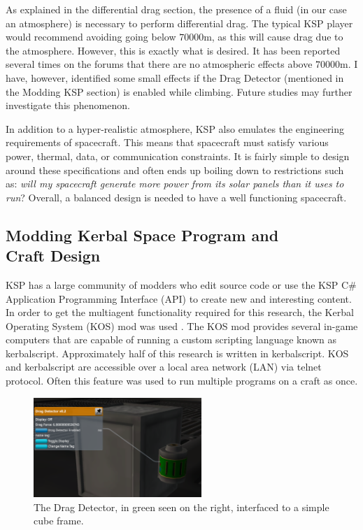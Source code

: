 \documentclass[journal,a4paper,12pt]{IEEEtran}
\begin{document}
As explained in the differential drag section, the presence of a fluid (in our case
an atmosphere) is necessary to perform differential drag. The typical KSP player
would recommend avoiding going below
$70000$m, as this will cause drag due to the atmosphere. However, this is exactly what
is desired. It has been reported several times on the forums that there are no
atmospheric effects above $70000$m. I have, however, identified some small effects
if the Drag Detector (mentioned in the Modding KSP section) is enabled while climbing.
Future studies may further investigate this phenomenon.

In addition to a hyper-realistic atmosphere, KSP also emulates the engineering requirements
of spacecraft. This means that spacecraft must satisfy various power, thermal, data,
or communication constraints. It is fairly simple to design around these specifications and
often ends up boiling down to restrictions such as: \textit{will my spacecraft generate more power from its
solar panels than it uses to run}? Overall, a balanced design is needed to have a well
functioning spacecraft.

\subsection{Modding Kerbal Space Program and\\ Craft Design}
KSP has a large community of modders who edit source code or use the KSP
C\# Application Programming Interface (API) to create new and interesting content.
In order to get the multiagent functionality required for this research, the
Kerbal Operating System (KOS) mod was used \cite{kos}. The KOS mod provides several
in-game computers that are capable of running a custom scripting language known
as kerbalscript. Approximately half of this research is written in kerbalscript.
KOS and kerbalscript are accessible
over a local area network (LAN) via telnet
protocol. Often this feature was used to run multiple programs on a craft as once.

\begin{figure}[h!]
  \centering
  \includegraphics[width=2.5in]{img/dragdetector}
  \caption{The Drag Detector, in green seen on the right, interfaced to a simple cube frame.}
  \label{drag_detector}
\end{figure}
\end{document}
